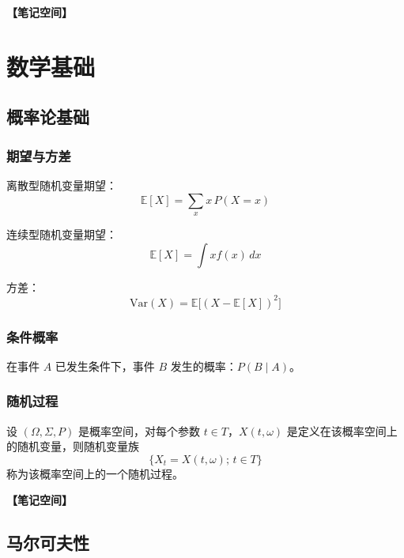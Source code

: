 \documentclass[12pt,a4paper]{article}
\newcommand{\notespace}[1][3cm]{%
  \vspace{#1}%
  \noindent\textbf{【笔记空间】}%
  \vspace{#1}%
}
\newcommand{\E}{\mathbb{E}}
\newcommand{\1}{\mathbf{1}}
\begin{document}
\notespace[3cm]

\newpage

\section{数学基础}

\subsection{概率论基础}

\subsubsection*{期望与方差}

离散型随机变量期望：
\begin{equation}
\E[X]=\sum_x x\,P(X=x)
\end{equation}

连续型随机变量期望：
\begin{equation}
\E[X]=\int x f(x)\,dx
\end{equation}

方差：
\begin{equation}
\mathrm{Var}(X)=\E\bigl[(X-\E[X])^2\bigr]
\end{equation}

\subsubsection*{条件概率}

在事件 $A$ 已发生条件下，事件 $B$ 发生的概率：$P(B\mid A)$。

\subsubsection*{随机过程}

设 $(\Omega,\Sigma,P)$ 是概率空间，对每个参数 $t\in T$，$X(t,\omega)$ 是定义在该概率空间上的随机变量，则随机变量族
\begin{equation}
\{X_t=X(t,\omega);\, t\in T\}
\end{equation}
称为该概率空间上的一个随机过程。

\notespace[2cm]

\subsection{马尔可夫性}
\end{document}
